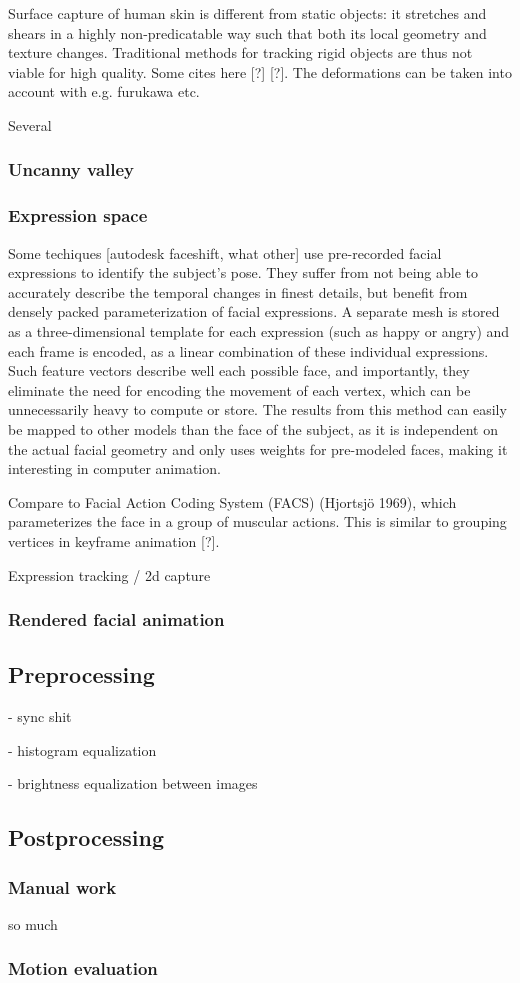 Surface capture of human skin is different from static objects: it stretches and shears in a highly non-predicatable way such that both its local geometry and texture changes.
Traditional methods for tracking rigid objects are thus not viable for high quality.
Some cites here [?] [?]. The deformations can be taken into account with e.g. furukawa etc.

Several 

\subsubsection{Uncanny valley}

\subsubsection{Expression space}

Some techiques [autodesk faceshift, what other] use pre-recorded facial expressions to identify the subject's pose. They suffer from not being able to accurately describe the temporal changes in finest details, but benefit from densely packed parameterization of facial expressions.
A separate mesh is stored as a three-dimensional template for each expression (such as happy or angry) and each frame is encoded, as a linear combination of these individual expressions.
Such feature vectors describe well each possible face, and importantly, they eliminate the need for encoding the movement of each vertex, which can be unnecessarily heavy to compute or store.
The results from this method can easily be mapped to other models than the face of the subject, as it is independent on the actual facial geometry and only uses weights for pre-modeled faces, making it interesting in computer animation.

Compare to Facial Action Coding System (FACS) (Hjortsjö 1969), which parameterizes the face in a group of muscular actions. This is similar to grouping vertices in keyframe animation [?].

Expression tracking / 2d capture

\subsubsection{Rendered facial animation}


\subsection{Preprocessing}

- sync shit

- histogram equalization

- brightness equalization between images


\subsection{Postprocessing}

\subsubsection{Manual work}

so much

\subsubsection{Motion evaluation}
